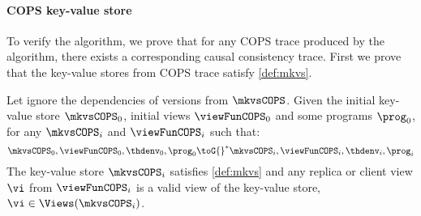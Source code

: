\paragraph{\bf COPS key-value store}
To verify the algorithm, we prove that for any COPS trace produced by the algorithm,
there exists a corresponding causal consistency trace.
First we prove that the key-value stores from COPS trace satisfy \cref{def:mkvs}.

\begin{theorem}
    \label{thm:cops-key-value-well-form}
    Let ignore the dependencies of versions from \( \mkvsCOPS \).
    Given the initial key-value store \( \mkvsCOPS_0 \), initial views \( \viewFunCOPS_0 \) and some programs \( \prog_0 \), for any \( \mkvsCOPS_i \) and \( \viewFunCOPS_i \)  such that: 
    \[
        \mkvsCOPS_0, \viewFunCOPS_0, \thdenv_0, \prog_0 {\toG{}}^* \mkvsCOPS_i, \viewFunCOPS_i, \thdenv_i, \prog_i
    \]
    The key-value store \( \mkvsCOPS_i \) satisfies \cref{def:mkvs} and any replica or client view \( \vi \) from \( \viewFunCOPS_i \) is a valid view of the key-value store, \ie \( \vi \in \Views(\mkvsCOPS_i) \).
\end{theorem}
